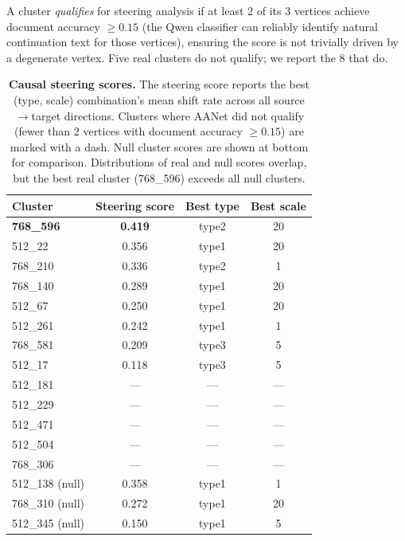 \documentclass{article}
\begin{document}
A cluster \emph{qualifies} for steering analysis if at least 2 of its 3 vertices
achieve document accuracy $\geq 0.15$ (the Qwen classifier can reliably identify
natural continuation text for those vertices), ensuring the score is not trivially
driven by a degenerate vertex.  Five real clusters do not qualify; we report the
8 that do.

\begin{table}[t]
  \centering
  \caption{%
    \textbf{Causal steering scores.}
    The steering score reports the best (type, scale) combination's mean shift
    rate across all source$\to$target directions.  Clusters where AANet did not
    qualify (fewer than 2 vertices with document accuracy $\geq 0.15$) are marked
    with a dash.  Null cluster scores are shown at bottom for comparison.
    Distributions of real and null scores overlap, but the best real cluster
    (768\_596) exceeds all null clusters.
  }
  \label{tab:steering}
  \begin{tabular}{lccc}
    \toprule
    Cluster & Steering score & Best type & Best scale \\
    \midrule
    \textbf{768\_596} & \textbf{0.419} & type2 & 20 \\
    512\_22   & 0.356 & type1 & 20 \\
    768\_210  & 0.336 & type2 & 1 \\
    768\_140  & 0.289 & type1 & 20 \\
    512\_67   & 0.250 & type1 & 20 \\
    512\_261  & 0.242 & type1 & 1 \\
    768\_581  & 0.209 & type3 & 5 \\
    512\_17   & 0.118 & type3 & 5 \\
    512\_181  & ---   &  ---  & --- \\
    512\_229  & ---   &  ---  & --- \\
    512\_471  & ---   &  ---  & --- \\
    512\_504  & ---   &  ---  & --- \\
    768\_306  & ---   &  ---  & --- \\
    \midrule
    512\_138 (null) & 0.358 & type1 & 1 \\
    768\_310 (null) & 0.272 & type1 & 20 \\
    512\_345 (null) & 0.150 & type1 & 5 \\
    \bottomrule
  \end{tabular}
\end{table}
\end{document}
